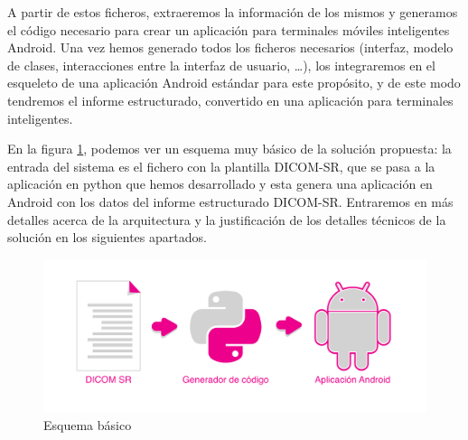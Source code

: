 A partir de estos ficheros, extraeremos la información de los mismos y generamos el código necesario para crear un aplicación para terminales móviles inteligentes Android. Una vez hemos generado todos los ficheros necesarios (interfaz, modelo de clases, interacciones entre la interfaz de usuario, \ldots), los integraremos en el esqueleto de una aplicación Android estándar para este propósito, y de este modo tendremos el informe estructurado, convertido en una aplicación para terminales inteligentes.\par
En la figura \ref{fig:basic_schema}, podemos ver un esquema muy básico de la solución propuesta: la entrada del sistema es el fichero con la plantilla DICOM-SR, que se pasa a la aplicación en python que hemos desarrollado y esta genera una aplicación en Android con los datos del informe estructurado DICOM-SR. Entraremos en más detalles acerca de la arquitectura y la justificación de los detalles técnicos de la solución en los siguientes apartados.\bigskip\par

\begin{figure}[ht]
\centering
\includegraphics[scale=0.6]{./imgs/esquemas/simple.pdf}
\caption{Esquema básico}
\label{fig:basic_schema}
\end{figure}

